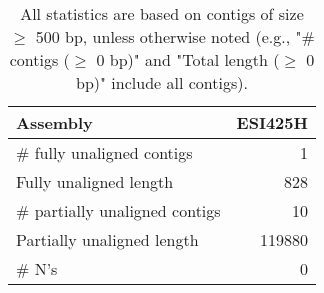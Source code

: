 \documentclass[12pt,a4paper]{article}
\begin{document}
\begin{table}[ht]
\begin{center}
\caption{All statistics are based on contigs of size $\geq$ 500 bp, unless otherwise noted (e.g., "\# contigs ($\geq$ 0 bp)" and "Total length ($\geq$ 0 bp)" include all contigs).}
\begin{tabular}{|l*{1}{|r}|}
\hline
Assembly & ESI425H \\ \hline
\# fully unaligned contigs & 1 \\ \hline
Fully unaligned length & 828 \\ \hline
\# partially unaligned contigs & 10 \\ \hline
Partially unaligned length & 119880 \\ \hline
\# N's & 0 \\ \hline
\end{tabular}
\end{center}
\end{table}
\end{document}
